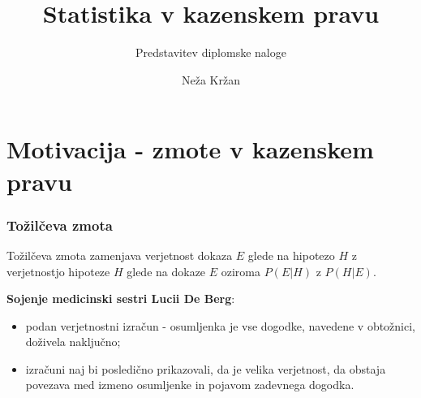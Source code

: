 \documentclass{beamer}
\begin{document}
\title{Statistika v kazenskem pravu}
\subtitle{Predstavitev diplomske naloge}
\author[Neža Kržan]{Neža Kržan}
 
\date[7. september 2023] {}

\subject{Talks}

\begin{frame}
   \titlepage
\end{frame}

\section{Motivacija - zmote v kazenskem pravu}

\begin{frame}
   \frametitle{Tožilčeva zmota}
   \begin{block}{Tožilčeva zmota}
      zamenjava verjetnost dokaza $E$ glede na hipotezo $H$ z verjetnostjo hipoteze $H$ glede na dokaze $E$ oziroma $P(E \lvert H)$ z $P(H \lvert E)$.
   \end{block} \vspace{4mm}
  \textbf{Sojenje medicinski sestri Lucii De Berg}:
  \begin{itemize}
   \item podan verjetnostni izračun - osumljenka je vse dogodke, navedene v obtožnici, doživela naključno;
   \item izračuni naj bi posledično prikazovali, da je velika verjetnost, da obstaja povezava med izmeno osumljenke in pojavom zadevnega dogodka.
  \end{itemize}
\end{frame}
\end{document}
